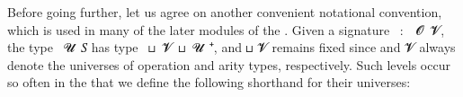 \ccpad
\begin{comment}
However, for the sake of completeness, here is how one could define a type representing the product of algebras inhabiting the record type \AgdaRecord{algebra}.
\ccpad
\begin{code}%
\>[0][@{}l@{\AgdaIndent{0}}]%
\>[1]\AgdaFunction{⨅'}\AgdaSpace{}%
\AgdaSymbol{:}\AgdaSpace{}%
\AgdaSymbol{(}\AgdaBound{𝒜}\AgdaSpace{}%
\AgdaSymbol{:}\AgdaSpace{}%
\AgdaBound{I}\AgdaSpace{}%
\AgdaSymbol{→}\AgdaSpace{}%
\AgdaRecord{algebra}\AgdaSpace{}%
\AgdaBound{𝓤}\AgdaSpace{}%
\AgdaBound{𝑆}\AgdaSymbol{)}\AgdaSpace{}%
\AgdaSymbol{→}\AgdaSpace{}%
\AgdaRecord{algebra}\AgdaSpace{}%
\AgdaSymbol{(}\AgdaBound{𝓘}\AgdaSpace{}%
\AgdaOperator{\AgdaPrimitive{⊔}}\AgdaSpace{}%
\AgdaBound{𝓤}\AgdaSymbol{)}\AgdaSpace{}%
\AgdaBound{𝑆}\<%
\\
\>[1]\AgdaFunction{⨅'}\AgdaSpace{}%
\AgdaBound{𝒜}\AgdaSpace{}%
\AgdaSymbol{=}\AgdaSpace{}%
\AgdaKeyword{record}%
\>[100I]\AgdaSymbol{\{}\AgdaSpace{}%
\AgdaField{univ}\AgdaSpace{}%
\AgdaSymbol{=}\AgdaSpace{}%
\AgdaSymbol{∀}\AgdaSpace{}%
\AgdaBound{i}\AgdaSpace{}%
\AgdaSymbol{→}\AgdaSpace{}%
\AgdaField{univ}\AgdaSpace{}%
\AgdaSymbol{(}\AgdaBound{𝒜}\AgdaSpace{}%
\AgdaBound{i}\AgdaSymbol{)}\AgdaSpace{}\AgdaSymbol{;}%
\>[55]\AgdaComment{-- domain}\<%
\\
\>[100I][@{}l@{\AgdaIndent{0}}]%
\>[15]\AgdaField{op}\AgdaSpace{}%
\AgdaSymbol{=}\AgdaSpace{}%
\AgdaSymbol{λ}\AgdaSpace{}%
\AgdaBound{𝑓}\AgdaSpace{}%
\AgdaBound{𝑎}\AgdaSpace{}%
\AgdaBound{i}\AgdaSpace{}%
\AgdaSymbol{→}\AgdaSpace{}%
\AgdaSymbol{(}\AgdaField{op}\AgdaSpace{}%
\AgdaSymbol{(}\AgdaBound{𝒜}\AgdaSpace{}%
\AgdaBound{i}\AgdaSymbol{))}\AgdaSpace{}%
\AgdaBound{𝑓}\AgdaSpace{}%
\AgdaSymbol{λ}\AgdaSpace{}%
\AgdaBound{x}\AgdaSpace{}%
\AgdaSymbol{→}\AgdaSpace{}%
\AgdaBound{𝑎}\AgdaSpace{}%
\AgdaBound{x}\AgdaSpace{}%
\AgdaBound{i}\AgdaSpace{}\AgdaSymbol{\}}%
\>[55]\AgdaComment{-- basic operations}\<%
\end{code}
\ccpad
\end{comment}
Before going further, let us agree on another convenient notational convention, which is used in many of the later modules of the \ualib. Given a signature ~\as :~~\ab 𝓞~\ab 𝓥, the type ~\ab 𝓤~\ab 𝑆 has type ~\ap ⊔~\ab 𝓥~\ap ⊔~\ab 𝓤~\af ⁺\af ̇, and  \ap ⊔ \ab 𝓥 remains fixed since  and \ab 𝓥 always denote the universes of operation and arity types, respectively. Such levels occur so often in the \ualib that we define the following shorthand for their universes: \AgdaSpace{}%
